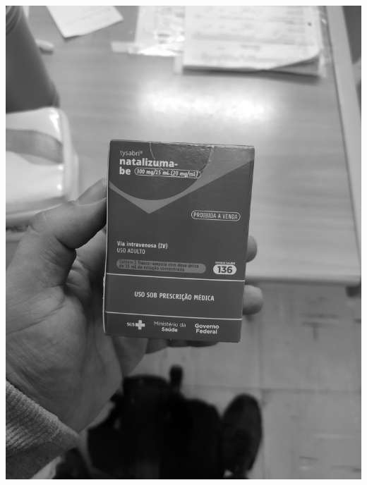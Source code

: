 \begin{frame}
	\centering
	\begin{columns}
		\begin{column}{0.24\textwidth}\centering
			\includegraphics[height=0.35\textheight]{../pictures/tysabri_gray.jpg}
			\\\vspace{\floatsep}

\end{column}
\end{columns}
\end{frame}
